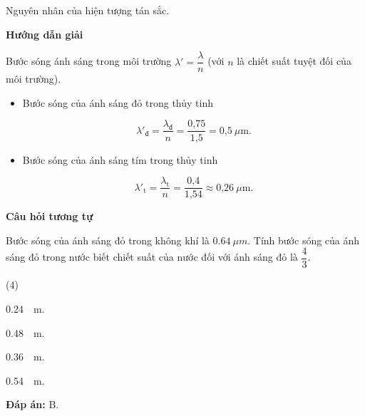 \begin{dang}{Nguyên nhân của hiện tượng tán sắc.}

	{	
		\begin{center}
			\textbf{Hướng dẫn giải}
		\end{center}
		
		Bước sóng ánh sáng trong môi trường $\lambda ' =\dfrac{\lambda}{n}$ (với $n$ là chiết suất tuyệt đối của môi trường).
		
		\begin{itemize}
			\item Bước sóng của ánh sáng đỏ trong thủy tinh
			
			\begin{equation*}
			\lambda'_{\text{đ}} =\dfrac{\lambda_{\text{đ}}}{n}=\dfrac{\text{0,75}}{\text{1,5}}=\text{0,5}\ \mu \text{m}.
			\end{equation*}
			\item Bước sóng của ánh sáng tím trong thủy tinh
			
			\begin{equation*}
			\lambda'_{\text{t}} =\dfrac{\lambda_{\text{t}}}{n}=\dfrac{\text{0,4}}{\text{1,54}}\approx \text{0,26}\ \mu \text{m}.
			\end{equation*}
		\end{itemize}
		
	\begin{center}
	\textbf{Câu hỏi tương tự}
	\end{center}

	Bước sóng của ánh sáng đỏ trong không khí là $ \SI{0.64}{\mu m} $. Tính 	bước sóng của ánh sáng đỏ trong nước biết chiết suất của nước đối với ánh sáng đỏ là $ \dfrac{4}{3} $.
	\begin{mcq}(4)
		\item \SI{0,24}{\mu m}.
		\item \SI{0,48}{\mu m}.
		\item \SI{0,36}{\mu m}.
		\item \SI{0,54}{\mu m}.
	\end{mcq}
	\textbf{Đáp án:} B.
	}
	

\end{dang}
